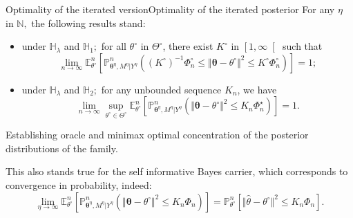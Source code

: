 \documentclass[10pt]{beamer}
\begin{document}
\begin{frame}{Optimality of the iterated version}{Optimality of the iterated posterior}
For any $\eta$ in $\mathbb{N},$ the following results stand:
\begin{itemize}
	\item under $\mathbb{H}_{\lambda}$ and $\mathbb{H}_{1};$ for all $\theta^{\circ}$ in $\Theta^{\circ}$, there exist $K^{\circ}$ in $\left[1, \infty \right[$ such that
	\[\lim\limits_{n \rightarrow \infty} \mathbb{E}_{\theta^{\circ}}^{n}\left[\mathbb{P}_{\boldsymbol{\theta}^{\eta}, M^{\eta} \vert Y^{\eta}}^{n}\left(\left(K^{\circ}\right)^{-1} \Phi_{n}^{\circ} \leq \Vert \boldsymbol{\theta} - \theta^{\circ} \Vert^{2} \leq K^{\circ} \Phi_{n}^{\circ} \right)\right] = 1;\]
	\item under $\mathbb{H}_{\lambda}$ and $\mathbb{H}_{2};$ for any unbounded sequence $K_{n}$, we have
	\[\lim\limits_{n \rightarrow \infty} \sup\limits_{\theta^{\circ} \in \Theta^{\circ}} \mathbb{E}_{\theta^{\circ}}^{n}\left[\mathbb{P}_{\boldsymbol{\theta}^{\eta}, M^{\eta} \vert Y^{\eta}}^{n}\left(\Vert \boldsymbol{\theta} - \theta^{\circ} \Vert^{2} \leq K_{n} \Phi_{n}^{\star} \right)\right] = 1.\]
\end{itemize}
Establishing oracle and minimax optimal concentration of the posterior distributions of the family.

This also stands true for the self informative Bayes carrier, which corresponds to convergence in probability, indeed:
\[\lim\limits_{\eta \rightarrow \infty}\mathbb{E}_{\theta^{\circ}}^{n}\left[\mathbb{P}_{\boldsymbol{\theta}^{\eta}, M^{\eta} \vert Y^{\eta}}^{n}\left(\Vert \boldsymbol{\theta} - \theta^{\circ} \Vert^{2} \leq K_{n} \Phi_{n} \right)\right] = \mathbb{P}_{\theta^{\circ}}^{n}\left[\Vert \widehat{\theta} - \theta^{\circ} \Vert^{2} \leq K_{n} \Phi_{n}\right].\]
\end{frame}
\end{document}
